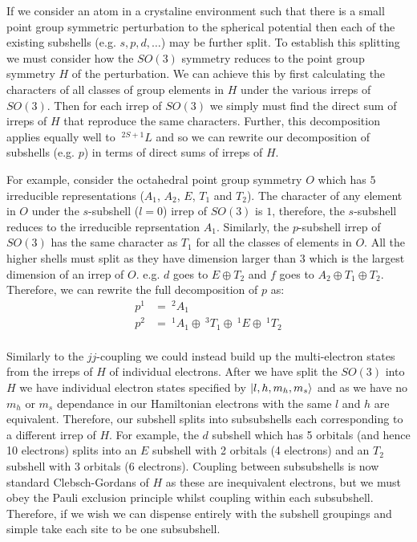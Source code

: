 \documentclass{article}
\begin{document}
If we consider an atom in a crystaline environment such that there is a small point group symmetric perturbation to the spherical potential then each of the existing subshells (e.g. $s,p,d,\ldots$) may be further split. To establish this splitting we must consider how the $SO(3)$ symmetry reduces to the point group symmetry $H$ of the perturbation. We can achieve this by first calculating the characters of all classes of group elements in $H$ under the various irreps of $SO(3)$. Then for each irrep of $SO(3)$ we simply must find the direct sum of irreps of $H$ that reproduce the same characters. Further, this decomposition applies equally well to $\>^{2S+1}L$ and so we can rewrite our decomposition of subshells (e.g. $p$) in terms of direct sums of irreps of $H$.

For example, consider the octahedral point group symmetry $O$ which has $5$ irreducible representations ($A_1$, $A_2$, $E$, $T_1$ and $T_2$). The character of any element in $O$ under the $s$-subshell ($l=0$) irrep of $SO(3)$ is $1$, therefore, the $s$-subshell reduces to the irreducible reprsentation $A_1$. Similarly, the $p$-subshell irrep of $SO(3)$ has the same character as $T_1$ for all the classes of elements in $O$. All the higher shells must split as they have dimension larger than $3$ which is the largest dimension of an irrep of $O$. e.g. $d$ goes to $E\oplus T_2$ and $f$ goes to $A_2 \oplus T_1 \oplus T_2$. Therefore, we can rewrite the full decomposition of $p$ as:
\begin{align}
    p^1 &= \>^2A_1\\
    p^2 &= \>^1A_1 \oplus \>^3T_1 \oplus \>^1E \oplus \>^1T_2 \\
\end{align}

Similarly to the $jj$-coupling we could instead build up the multi-electron states from the irreps of $H$ of individual electrons. After we have split the $SO(3)$ into $H$ we have individual electron states specified by $\ket{l,h,m_h,m_s}$ and as we have no $m_h$ or $m_s$ dependance in our Hamiltonian electrons with the same $l$ and $h$ are equivalent. Therefore, our subshell splits into subsubshells each corresponding to a different irrep of $H$. For example, the $d$ subshell which has 5 orbitals (and hence 10 electrons) splits into an $E$ subshell with 2 orbitals (4 electrons) and an $T_2$ subshell with 3 orbitals (6 electrons). Coupling between subsubshells is now standard Clebsch-Gordans of $H$ as these are inequivalent electrons, but we must obey the Pauli exclusion principle whilst coupling within each subsubshell. Therefore, if we wish we can dispense entirely with the subshell groupings and simple take each site to be one subsubshell. 
\end{document}
